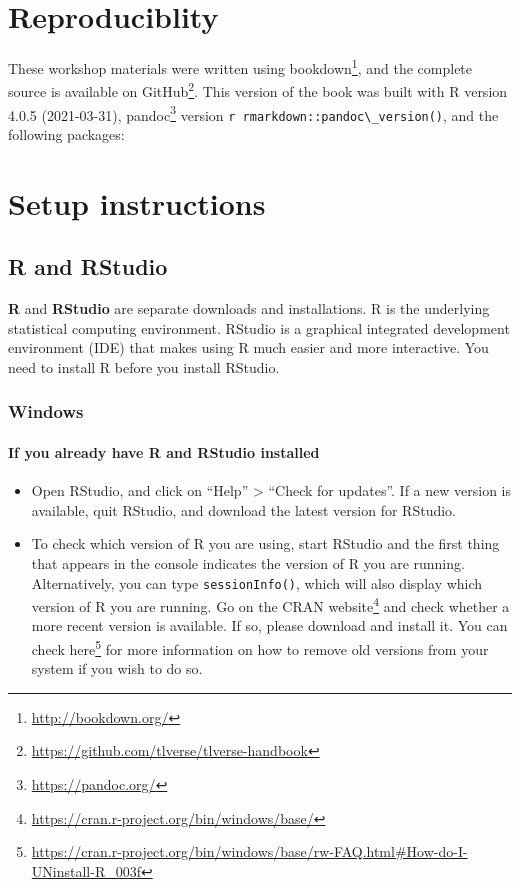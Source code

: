 \documentclass[
  12pt,
]{book}
\newcommand{\passthrough}[1]{#1}
\providecommand{\tightlist}{%
  \setlength{\itemsep}{0pt}\setlength{\parskip}{0pt}}
\renewcommand{\href}[2]{#2\footnote{\url{#1}}}
\theoremstyle{definition}
\theoremstyle{definition}
\theoremstyle{definition}
\newcommand{\1}{\mathbbm{1}}
\begin{document}
\hypertarget{repro}{%
\section{Reproduciblity}\label{repro}}

These workshop materials were written using \href{http://bookdown.org/}{bookdown},
and the complete source is available on
\href{https://github.com/tlverse/tlverse-handbook}{GitHub}. This version of the book
was built with R version 4.0.5 (2021-03-31), \href{https://pandoc.org/}{pandoc} version \passthrough{\lstinline!r rmarkdown::pandoc\_version()!}, and the following packages:

\hypertarget{setup}{%
\section{Setup instructions}\label{setup}}

\hypertarget{r-and-rstudio}{%
\subsection{R and RStudio}\label{r-and-rstudio}}

\textbf{R} and \textbf{RStudio} are separate downloads and installations. R is the
underlying statistical computing environment. RStudio is a graphical integrated
development environment (IDE) that makes using R much easier and more
interactive. You need to install R before you install RStudio.

\hypertarget{windows}{%
\subsubsection{Windows}\label{windows}}

\hypertarget{if-you-already-have-r-and-rstudio-installed}{%
\paragraph{If you already have R and RStudio installed}\label{if-you-already-have-r-and-rstudio-installed}}

\begin{itemize}
\tightlist
\item
  Open RStudio, and click on ``Help'' \textgreater{} ``Check for updates''. If a new version is
  available, quit RStudio, and download the latest version for RStudio.
\item
  To check which version of R you are using, start RStudio and the first thing
  that appears in the console indicates the version of R you are
  running. Alternatively, you can type \passthrough{\lstinline!sessionInfo()!}, which will also display
  which version of R you are running. Go on the \href{https://cran.r-project.org/bin/windows/base/}{CRAN
  website} and check whether a
  more recent version is available. If so, please download and install it. You
  can \href{https://cran.r-project.org/bin/windows/base/rw-FAQ.html\#How-do-I-UNinstall-R_003f}{check here}
  for more information on how to remove old versions from your system if you
  wish to do so.
\end{itemize}
\end{document}
